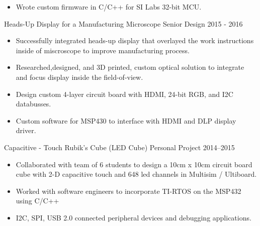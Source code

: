 \documentclass[]{bergman-cv} %
\begin{document}
\begin{entrylist}
{\begin{itemize}
	\item Wrote custom firmware in C/C++ for SI Labs 32-bit MCU.
\end{itemize}}
\vspace{16pt}
\entryFourItem
{Heads-Up Display for a Manufacturing Microscope}
{Senior Design}
{2015 - 2016}
{\begin{itemize}	\setlength\itemsep{0.25em} \vspace*{-5pt}
	\item Successfully integrated heads-up display that overlayed the work instructions inside of miscroscope to improve manufacturing process.
	\item Researched,designed, and 3D printed, custom optical solution to integrate and focus display inside the field-of-view.
	\item Design custom 4-layer circuit board	with HDMI, 24-bit RGB, and I2C databusses.
	\item Custom software for MSP430 to interface with HDMI and DLP display driver.
\end{itemize}}
\vspace{10pt}
\entryFourItem
{Capacitive - Touch Rubik's Cube (LED Cube)}
{Personal Project}
{2014--2015}
{\begin{itemize}	\setlength\itemsep{0.25em} \vspace*{-5pt}
	\item Collaborated with team of 6 students to design a 10cm x 10cm circuit board cube with 2-D capacitive touch and 648 led channels in Multisim / Ultiboard.
	\item Worked with software engineers to incorporate TI-RTOS on the MSP432 using C/C++
	\item I2C, SPI, USB 2.0 connected peripheral devices and debugging applications.


\end{itemize}}
\end{entrylist}
\end{document}
